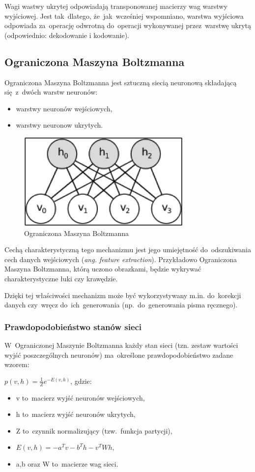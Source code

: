 Wagi wastwy ukrytej odpowiadają transponowanej macierzy wag warstwy wyjściowej. Jest tak~dlatego, że~jak~wcześniej
wspomniano, warstwa wyjściowa odpowiada za~operację odwrotną do~operacji wykonywanej przez~warstwę ukrytą (odpowiednio:
dekodowanie i kodowanie).

\subsection{Ograniczona Maszyna Boltzmanna}
Ograniczona Maszyna Boltzmanna jest sztuczną siecią neuronową składającą się~z~dwóch warstw neuronów:
\begin{itemize}
  \item warstwy neuronów wejściowych,
  \item warstwy neuronow ukrytych.
\end{itemize}

\begin{figure}
	\centering
	\includegraphics[width=0.5\linewidth]{img/RBM.png}
	\caption{Ograniczona Maszyna Boltzmanna}
\end{figure}

Cechą charakterystyczną tego mechanizmu jest jego umiejętność do~odszukiwania cech danych wejściowych
(\textit{ang. feature extraction}). Przykładowo Ograniczona Maszyna Boltzmanna, którą uczono obrazkami, będzie
wykrywać charakterystyczne łuki czy krawędzie.

Dzięki tej właściwości mechanizm może być wykorzystywany m.in. do~korekcji danych czy~wręcz do~ich~generowania
(np.~do~generowania pisma ręcznego).

\subsubsection{Prawdopodobieństwo stanów sieci}
W~Ograniczonej Maszynie Boltzmanna każdy stan sieci (tzn. zestaw wartości wyjść poszczególnych neuronów)
ma~określone prawdopodobieństwo zadane wzorem:

$p(v,h)=\frac{1}{Z}e^{-E(v,h)}$, gdzie:
\begin{itemize}
  \item v to~macierz wyjść neuronów wejściowych,
  \item h to~macierz wyjść neuronów ukrytych,
  \item Z to~czynnik normalizujący (tzw.~funkcja partycji),
  \item $E(v,h)=-a^{T}v-b^{T}h-v^{T}Wh$,
  \item a,b oraz W to~macierze wag sieci.
\end{itemize}

